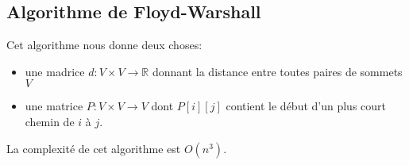 \documentclass[french]{article}
\theoremstyle{definition}
\begin{document}
		\subsection{Algorithme de Floyd-Warshall}
		Cet algorithme nous donne deux choses:
		\begin{itemize}
			\item une madrice $d : V \times V \to \mathbb{R}$ donnant la distance entre toutes paires de sommets $V$
			\item une matrice $P : V \times V \to V$ dont $P[i][j]$ contient le début d'un plus court chemin de $i$ à $j$.
		\end{itemize}
		La complexité de cet algorithme est $O(n^3)$.
		\begin{algorithmic}[1]
					\ELSE
					\ENDIF
				\ENDFOR
			\ENDFOR
						\ENDIF
					\ENDFOR
				\ENDFOR
			\ENDFOR
			\ENDFOR
		\end{algorithmic}
\end{document}
